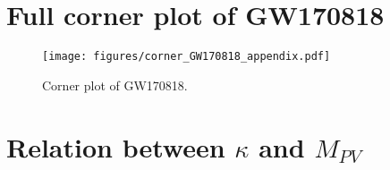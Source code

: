 \documentclass[aps,prd,twocolumn,superscriptaddress,preprintnumbers,floatfix,nofootinbib]{revtex4-2}
\begin{document}
\section{Full corner plot of GW170818}
\label{sec:corner_GW170818_appendix}

\begin{figure*}[h]
    \texttt{[image: figures/corner\_GW170818\_appendix.pdf]}
    \caption{
        Corner plot of GW170818.
    }
    \label{fig:corner_GW170818_appendix}
\end{figure*}

\section{Relation between $\kappa$ and $M_{PV}$}
\label{sec:M_PV_derivation}
\end{document}
